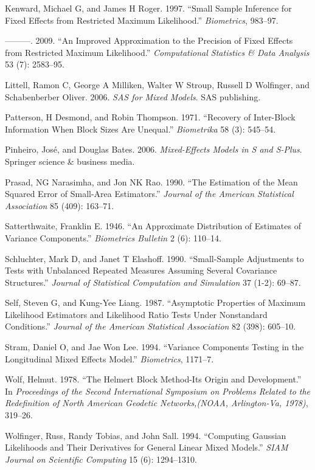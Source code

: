 \documentclass{article}
\begin{document}
\leavevmode\hypertarget{ref-kenward1997small}{}%
Kenward, Michael G, and James H Roger. 1997. ``Small Sample Inference
for Fixed Effects from Restricted Maximum Likelihood.''
\emph{Biometrics}, 983--97.

\leavevmode\hypertarget{ref-kenward2009improved}{}%
---------. 2009. ``An Improved Approximation to the Precision of Fixed
Effects from Restricted Maximum Likelihood.'' \emph{Computational
Statistics \& Data Analysis} 53 (7): 2583--95.

\leavevmode\hypertarget{ref-littell2006sas}{}%
Littell, Ramon C, George A Milliken, Walter W Stroup, Russell D
Wolfinger, and Schabenberber Oliver. 2006. \emph{SAS for Mixed Models}.
SAS publishing.

\leavevmode\hypertarget{ref-patterson1971recovery}{}%
Patterson, H Desmond, and Robin Thompson. 1971. ``Recovery of
Inter-Block Information When Block Sizes Are Unequal.''
\emph{Biometrika} 58 (3): 545--54.

\leavevmode\hypertarget{ref-pinheiro2006mixed}{}%
Pinheiro, José, and Douglas Bates. 2006. \emph{Mixed-Effects Models in S
and S-Plus}. Springer science \& business media.

\leavevmode\hypertarget{ref-prasad1990estimation}{}%
Prasad, NG Narasimha, and Jon NK Rao. 1990. ``The Estimation of the Mean
Squared Error of Small-Area Estimators.'' \emph{Journal of the American
Statistical Association} 85 (409): 163--71.

\leavevmode\hypertarget{ref-satterthwaite1946approximate}{}%
Satterthwaite, Franklin E. 1946. ``An Approximate Distribution of
Estimates of Variance Components.'' \emph{Biometrics Bulletin} 2 (6):
110--14.

\leavevmode\hypertarget{ref-schluchter1990small}{}%
Schluchter, Mark D, and Janet T Elashoff. 1990. ``Small-Sample
Adjustments to Tests with Unbalanced Repeated Measures Assuming Several
Covariance Structures.'' \emph{Journal of Statistical Computation and
Simulation} 37 (1-2): 69--87.

\leavevmode\hypertarget{ref-self1987asymptotic}{}%
Self, Steven G, and Kung-Yee Liang. 1987. ``Asymptotic Properties of
Maximum Likelihood Estimators and Likelihood Ratio Tests Under
Nonstandard Conditions.'' \emph{Journal of the American Statistical
Association} 82 (398): 605--10.

\leavevmode\hypertarget{ref-stram1994variance}{}%
Stram, Daniel O, and Jae Won Lee. 1994. ``Variance Components Testing in
the Longitudinal Mixed Effects Model.'' \emph{Biometrics}, 1171--7.

\leavevmode\hypertarget{ref-wolf1978helmert}{}%
Wolf, Helmut. 1978. ``The Helmert Block Method-Its Origin and
Development.'' In \emph{Proceedings of the Second International
Symposium on Problems Related to the Redefinition of North American
Geodetic Networks,(NOAA, Arlington-Va, 1978)}, 319--26.

\leavevmode\hypertarget{ref-wolfinger1994computing}{}%
Wolfinger, Russ, Randy Tobias, and John Sall. 1994. ``Computing Gaussian
Likelihoods and Their Derivatives for General Linear Mixed Models.''
\emph{SIAM Journal on Scientific Computing} 15 (6): 1294--1310.



\end{document}
